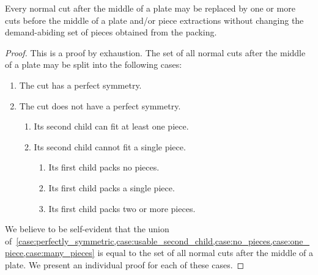 \documentclass[smallextended]{svjour3}       %
\begin{document}
\begin{theorem}
Every normal cut after the middle of a plate may be replaced by one or more cuts before the middle of a plate and/or piece extractions without changing the demand-abiding set of pieces obtained from the packing.
\end{theorem}

\begin{proof}
This is a proof by exhaustion. The set of all normal cuts after the middle of a plate may be split into the following cases:
\begin{enumerate}
  \item The cut has a perfect symmetry. \label{case:perfectly_symmetric}
  \item The cut does not have a perfect symmetry.
  \begin{enumerate}
    \item Its second child can fit at least one piece. \label{case:usable_second_child}
    \item Its second child cannot fit a single piece.
    \begin{enumerate}
      \item Its first child packs no pieces. \label{case:no_pieces}
      \item Its first child packs a single piece. \label{case:one_piece} %
      \item Its first child packs two or more pieces. \label{case:many_pieces}
    \end{enumerate}
  \end{enumerate}
\end{enumerate}

We believe to be self-evident that the union of~\cref{case:perfectly_symmetric,case:usable_second_child,case:no_pieces,case:one_piece,case:many_pieces} is equal to the set of all normal cuts after the middle of a plate. We present an individual proof for each of these cases.


\end{proof}
\end{document}

